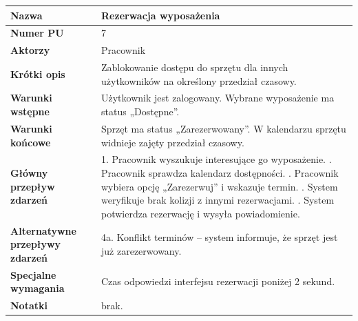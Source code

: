 \documentclass{article}
\begin{document}
    \begin{tabular}{|m{10em}|m{20em}|}
        \hline
        \textbf{Nazwa} & Rezerwacja wyposażenia \\
        \hline
        \textbf{Numer PU} & 7 \\
        \hline
        \textbf{Aktorzy} & Pracownik \\
        \hline
        \textbf{Krótki opis} & Zablokowanie dostępu do sprzętu dla innych użytkowników na określony przedział czasowy. \\
        \hline
        \textbf{Warunki wstępne} & Użytkownik jest zalogowany. Wybrane wyposażenie ma status „Dostępne”. \\
        \hline
        \textbf{Warunki końcowe} & Sprzęt ma status „Zarezerwowany”. W kalendarzu sprzętu widnieje zajęty przedział czasowy. \\
        \hline
        \textbf{Główny przepływ zdarzeń} & 
            1. Pracownik wyszukuje interesujące go wyposażenie. \newline
            2. Pracownik sprawdza kalendarz dostępności. \newline
            3. Pracownik wybiera opcję „Zarezerwuj” i wskazuje termin. \newline
            4. System weryfikuje brak kolizji z innymi rezerwacjami. \newline
            5. System potwierdza rezerwację i wysyła powiadomienie. \\
        \hline
        \textbf{Alternatywne przepływy zdarzeń} & 
            4a. Konflikt terminów – system informuje, że sprzęt jest już zarezerwowany. \\
        \hline
        \textbf{Specjalne wymagania} & Czas odpowiedzi interfejsu rezerwacji poniżej 2 sekund. \\
        \hline
        \textbf{Notatki} & brak. \\
        \hline
    \end{tabular}

    \vspace{1cm}
\end{document}
